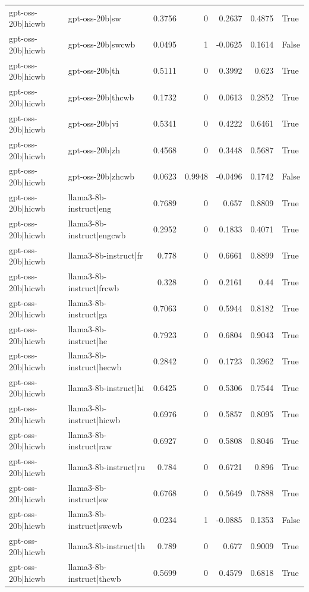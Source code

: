 \begin{table}
\begin{tabular}{l l r r r r l}
gpt-oss-20b|hicwb & gpt-oss-20b|sw & 0.3756 & 0 & 0.2637 & 0.4875 & True \\
gpt-oss-20b|hicwb & gpt-oss-20b|swcwb & 0.0495 & 1 & -0.0625 & 0.1614 & False \\
gpt-oss-20b|hicwb & gpt-oss-20b|th & 0.5111 & 0 & 0.3992 & 0.623 & True \\
gpt-oss-20b|hicwb & gpt-oss-20b|thcwb & 0.1732 & 0 & 0.0613 & 0.2852 & True \\
gpt-oss-20b|hicwb & gpt-oss-20b|vi & 0.5341 & 0 & 0.4222 & 0.6461 & True \\
gpt-oss-20b|hicwb & gpt-oss-20b|zh & 0.4568 & 0 & 0.3448 & 0.5687 & True \\
gpt-oss-20b|hicwb & gpt-oss-20b|zhcwb & 0.0623 & 0.9948 & -0.0496 & 0.1742 & False \\
gpt-oss-20b|hicwb & llama3-8b-instruct|eng & 0.7689 & 0 & 0.657 & 0.8809 & True \\
gpt-oss-20b|hicwb & llama3-8b-instruct|engcwb & 0.2952 & 0 & 0.1833 & 0.4071 & True \\
gpt-oss-20b|hicwb & llama3-8b-instruct|fr & 0.778 & 0 & 0.6661 & 0.8899 & True \\
gpt-oss-20b|hicwb & llama3-8b-instruct|frcwb & 0.328 & 0 & 0.2161 & 0.44 & True \\
gpt-oss-20b|hicwb & llama3-8b-instruct|ga & 0.7063 & 0 & 0.5944 & 0.8182 & True \\
gpt-oss-20b|hicwb & llama3-8b-instruct|he & 0.7923 & 0 & 0.6804 & 0.9043 & True \\
gpt-oss-20b|hicwb & llama3-8b-instruct|hecwb & 0.2842 & 0 & 0.1723 & 0.3962 & True \\
gpt-oss-20b|hicwb & llama3-8b-instruct|hi & 0.6425 & 0 & 0.5306 & 0.7544 & True \\
gpt-oss-20b|hicwb & llama3-8b-instruct|hicwb & 0.6976 & 0 & 0.5857 & 0.8095 & True \\
gpt-oss-20b|hicwb & llama3-8b-instruct|raw & 0.6927 & 0 & 0.5808 & 0.8046 & True \\
gpt-oss-20b|hicwb & llama3-8b-instruct|ru & 0.784 & 0 & 0.6721 & 0.896 & True \\
gpt-oss-20b|hicwb & llama3-8b-instruct|sw & 0.6768 & 0 & 0.5649 & 0.7888 & True \\
gpt-oss-20b|hicwb & llama3-8b-instruct|swcwb & 0.0234 & 1 & -0.0885 & 0.1353 & False \\
gpt-oss-20b|hicwb & llama3-8b-instruct|th & 0.789 & 0 & 0.677 & 0.9009 & True \\
gpt-oss-20b|hicwb & llama3-8b-instruct|thcwb & 0.5699 & 0 & 0.4579 & 0.6818 & True \\

\end{tabular}
\end{table}
